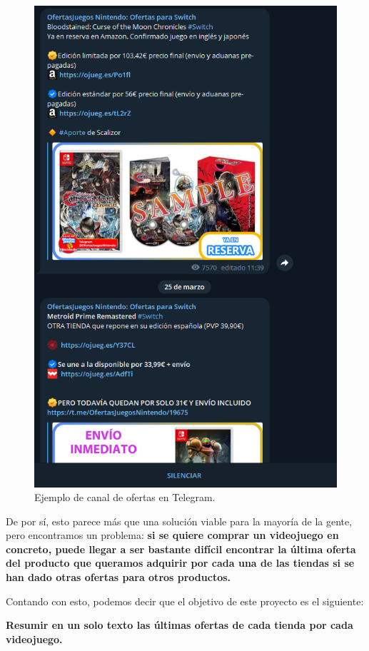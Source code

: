 \begin{figure}[h]
    \centering
    \includegraphics[scale=0.57]{figuras/canal_telegram_ofertas}
    \caption{Ejemplo de canal de ofertas en Telegram.}
    \label{fig:canal_telegram_ofertas}
\end{figure}

De por sí, esto parece más que una solución viable para la mayoría de la gente, pero encontramos un problema: \textbf{si se quiere comprar un videojuego en 
concreto, puede llegar a ser bastante difícil encontrar la última oferta del producto que queramos adquirir por cada una de las tiendas si se han dado 
otras ofertas para otros productos.}

Contando con esto, podemos decir que el objetivo de este proyecto es el siguiente:

\begin{center}
    \textbf{Resumir en un solo texto las últimas ofertas de cada tienda por cada videojuego.}
\end{center}

